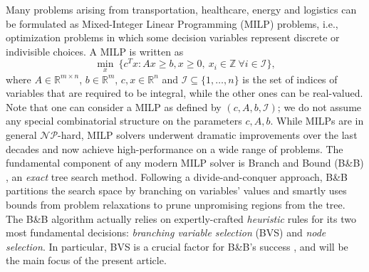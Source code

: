 \documentclass[letterpaper]{article} %
\begin{document}
Many problems arising from transportation, healthcare, energy and logistics can be formulated as Mixed-Integer Linear Programming (MILP) problems, i.e., optimization problems in which some decision variables represent discrete or indivisible choices. 
A MILP is written as
\begin{equation}
    \label{eq:mip}
    \min_x\:\{ c^T x:  A x \ge b, x \ge 0,~x_i \in \mathbb{Z}~\forall i \in \mathcal{I}\},
\end{equation}
where $A\in\mathbb{R}^{m\times n}$, $b\in\mathbb{R}^m$, $c, x\in\mathbb{R}^n$ and $\mathcal{I}\subseteq\{1,\dots,n\}$ is the set of indices of variables that are required to be integral, while the other ones can be real-valued. 
Note that one can consider a MILP as defined by $(c, A, b, \mathcal{I})$; we do not assume any special combinatorial structure on the parameters $c, A, b$. 
While MILPs are in general $\mathcal{NP}$-hard, MILP solvers underwent dramatic improvements over the last decades \cite{lodi2010mixed,Achterberg2013} and now achieve high-performance on a wide range of problems. 
The fundamental component of any modern MILP solver is Branch and Bound (B\&B) \cite{LandDoig1960}, an \emph{exact} tree search method. 
Following a divide-and-conquer approach, B\&B partitions the search space by branching on variables' values and smartly uses bounds from problem relaxations to prune unpromising regions from the tree. 
The B\&B algorithm actually relies on expertly-crafted \emph{heuristic} rules for its two most fundamental decisions: \emph{branching variable selection} (BVS) and \emph{node selection}. 
In particular, BVS is a crucial factor for B\&B's success \cite{Achterberg2013}, and will be the main focus of the present article.
\end{document}
